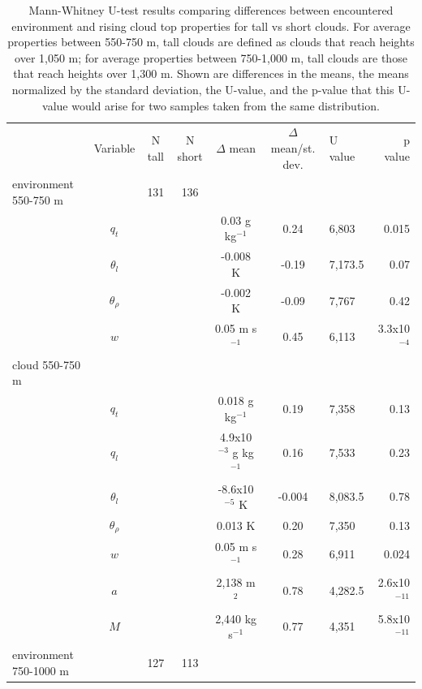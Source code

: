 \documentclass[acp]{copernicus}
\begin{document}




\begin{table}[t]
\label{tbl:mannwhitneyu}
\caption{Mann-Whitney U-test results comparing differences between 
encountered environment and rising cloud top properties for tall vs short 
clouds.  For average properties between 550-750 m, tall clouds are defined as 
clouds that reach heights over 1,050 m; for average properties between 
750-1,000 m, tall clouds are those that reach heights over 1,300 m.  Shown are 
differences in the means, the means normalized by the standard deviation, the 
U-value, and the p-value that this U-value would arise for two samples taken 
from the same distribution.}
\vskip4mm
\centering
\begin{tabular}{lccccclr}
\tophline
& Variable & N tall & N short & $\Delta$ mean & $\Delta$ mean/st. dev. & U value & p value\\
\middlehline
environment 550-750 m & & 131 & 136 & & & & \\
& $q_t$       & & &  0.03 g kg$^{-1}$          &  0.24 & 6,803   & 0.015    \\ 
& $\theta_l$ & & & -0.008 K                   & -0.19 & 7,173.5 & 0.07    \\
& $\theta_\rho$ & & & -0.002 K               & -0.09 & 7,767   & 0.42    \\
& $w$         & & &  0.05 m s$^{-1}$           &  0.45 & 6,113   & 3.3x10$^{-4}$ \\
cloud 550-750 m & & & & & & \\
& $q_t$       & & &  0.018 g kg$^{-1}$         &  0.19 & 7,358   & 0.13   \\
& $q_l$       & & &  4.9x10$^{-3}$ g kg$^{-1}$ &  0.16 & 7,533   & 0.23   \\
& $\theta_l$ & & & -8.6x10$^{-5}$ K           & -0.004 & 8,083.5 & 0.78 \\
& $\theta_\rho$ & & &  0.013 K               &  0.20 & 7,350   & 0.13  \\
& $w$         & & &  0.05 m s$^{-1}$           &  0.28 & 6,911   & 0.024  \\
& $a$         & & &  2,138 m$^2$                &  0.78 & 4,282.5 & 2.6x10$^{-11}$ \\
& $M$         & & &  2,440 kg s$^{-1}$    &  0.77 & 4,351 & 5.8x10$^{-11}$ \\
environment 750-1000 m & & 127 & 113 & & & & \\

\end{tabular}
\end{table}
\end{document}
